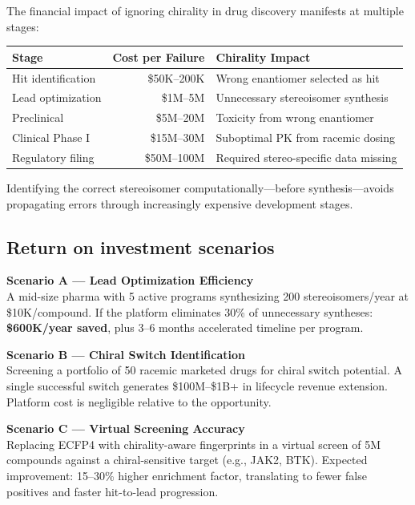 \documentclass[11pt,a4paper]{article}
\begin{document}
The financial impact of ignoring chirality in drug discovery manifests at
multiple stages:

\begin{center}
\begin{tabular}{lrl}
\toprule
\textbf{Stage} & \textbf{Cost per Failure} & \textbf{Chirality Impact} \\
\midrule
Hit identification & \$50K--200K & Wrong enantiomer selected as hit \\
Lead optimization & \$1M--5M & Unnecessary stereoisomer synthesis \\
Preclinical & \$5M--20M & Toxicity from wrong enantiomer \\
Clinical Phase I & \$15M--30M & Suboptimal PK from racemic dosing \\
Regulatory filing & \$50M--100M & Required stereo-specific data missing \\
\bottomrule
\end{tabular}
\end{center}

Identifying the correct stereoisomer computationally---before synthesis---avoids
propagating errors through increasingly expensive development stages.

\subsection{Return on investment scenarios}

\begin{financialbox}
\textbf{Scenario A --- Lead Optimization Efficiency}\\
A mid-size pharma with 5 active programs synthesizing 200 stereoisomers/year
at \$10K/compound. If the platform eliminates 30\% of unnecessary syntheses:
\textbf{\$600K/year saved}, plus 3--6 months accelerated timeline per program.

\vspace{6pt}
\textbf{Scenario B --- Chiral Switch Identification}\\
Screening a portfolio of 50 racemic marketed drugs for chiral switch potential.
A single successful switch generates \$100M--\$1B+ in lifecycle revenue extension.
Platform cost is negligible relative to the opportunity.

\vspace{6pt}
\textbf{Scenario C --- Virtual Screening Accuracy}\\
Replacing ECFP4 with chirality-aware fingerprints in a virtual screen of 5M
compounds against a chiral-sensitive target (e.g., JAK2, BTK). Expected
improvement: 15--30\% higher enrichment factor, translating to fewer false
positives and faster hit-to-lead progression.
\end{financialbox}
\end{document}
